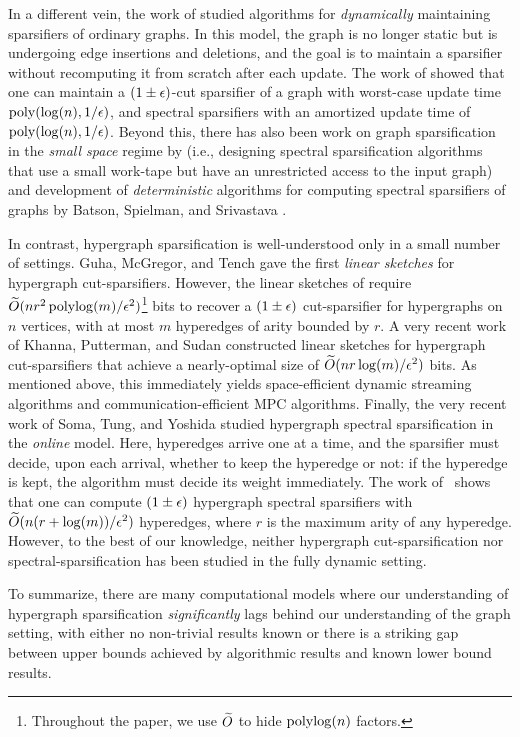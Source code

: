 \documentclass{article}
\begin{document}
In a different vein, the work of \cite{ADKKP16} studied algorithms for \emph{dynamically} maintaining sparsifiers of ordinary graphs. In this model, the graph is no longer static but is undergoing edge insertions and deletions, and the goal is to maintain a sparsifier without recomputing it from scratch after each update. The work of \cite{ADKKP16} showed that one can maintain a $(1 \pm \epsilon)$-cut sparsifier of a graph with worst-case update time $\mathrm{poly}(\log(n), 1 / \epsilon)$, and spectral sparsifiers with an amortized update time of $\mathrm{poly}(\log(n), 1 / \epsilon)$. Beyond this, there has also been work on graph sparsification in the \emph{small space} regime by \cite{DMVZ20} (i.e., designing spectral sparsification algorithms that use a small work-tape but have an unrestricted access to the input graph) and development of {\em deterministic} algorithms for computing spectral sparsifiers of graphs by Batson, Spielman, and Srivastava \cite{BSS09}.

In contrast, hypergraph sparsification is well-understood only in a small number of settings. Guha, McGregor, and Tench \cite{GMT15} gave the first {\em linear sketches} for hypergraph cut-sparsifiers. However, the linear sketches of \cite{GMT15} require $\widetilde{O}(n r^2 \operatorname{polylog}(m) / \epsilon^2)$\footnote{Throughout the paper, we use $\widetilde{O}$ to hide $\operatorname{polylog}(n)$ factors.} bits to recover a $(1 \pm \epsilon)$  cut-sparsifier for hypergraphs on $n$ vertices, with at most $m$ hyperedges of arity bounded by $r$. A very recent work of Khanna, Putterman, and Sudan \cite{KPS24c} constructed linear sketches for hypergraph cut-sparsifiers that achieve a nearly-optimal size of $\widetilde{O}(n r \log(m) / \epsilon^2)$ bits. As mentioned above, this immediately yields space-efficient dynamic streaming algorithms and communication-efficient MPC algorithms. Finally, the very recent work of Soma, Tung, and Yoshida \cite{STY24} studied hypergraph spectral sparsification in the \emph{online} model. Here, hyperedges arrive one at a time, and the sparsifier must decide, upon each arrival, whether to keep the hyperedge or not: if the hyperedge is kept, the algorithm must decide its weight immediately. The work of~\cite{STY24} shows that one can compute $(1 \pm \epsilon)$ hypergraph spectral sparsifiers with $\widetilde{O}(n(r + \log(m))/\epsilon^2)$ hyperedges, where $r$ is the maximum arity of any hyperedge.
However, to the best of our knowledge, neither hypergraph cut-sparsification nor spectral-sparsification has been studied in the fully dynamic setting.

To summarize, there are many computational models where our understanding of hypergraph sparsification \emph{significantly} lags behind our understanding of the graph setting, with either no non-trivial results known or there is a striking gap between upper bounds achieved by algorithmic results and known lower bound results.
\end{document}
